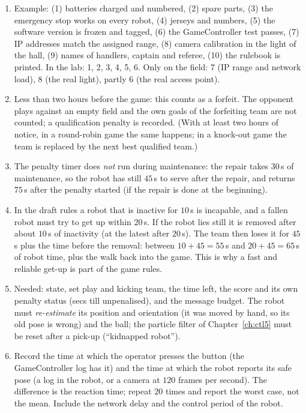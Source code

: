 \begin{enumerate}[label=\textbf{\ansnum.\arabic*}]
  \item Example: (1) batteries charged and numbered, (2) spare parts, (3) the emergency stop works on every robot, (4) jerseys and numbers, (5) the software version is frozen and tagged, (6) the GameController test passes, (7) IP addresses match the assigned range, (8) camera calibration in the light of the hall, (9) names of handlers, captain and referee, (10) the rulebook is printed. In the lab: 1, 2, 3, 4, 5, 6. Only on the field: 7 (IP range and network load), 8 (the real light), partly 6 (the real access point).
  \item Less than two hours before the game: this counts as a forfeit. The opponent plays against an empty field and the own goals of the forfeiting team are not counted; a qualification penalty is recorded. (With at least two hours of notice, in a round-robin game the same happens; in a knock-out game the team is replaced by the next best qualified team.)
  \item The penalty timer does \emph{not} run during maintenance: the repair takes $30$\,s of maintenance, so the robot has still $45$\,s to serve after the repair, and returns $75$\,s after the penalty started (if the repair is done at the beginning).
  \item In the draft rules a robot that is inactive for $10$\,s is incapable, and a fallen robot must try to get up within $20$\,s. If the robot lies still it is removed after about $10$\,s of inactivity (at the latest after $20$\,s). The team then loses it for $45$\,s plus the time before the removal: between $10+45=55$\,s and $20+45=65$\,s of robot time, plus the walk back into the game. This is why a fast and reliable get-up is part of the game rules.
  \item Needed: state, set play and kicking team, the time left, the score and its own penalty status (secs till unpenalised), and the message budget. The robot must \emph{re-estimate} its position and orientation (it was moved by hand, so its old pose is wrong) and the ball; the particle filter of Chapter~\ref{ch:ctl5} must be reset after a pick-up (``kidnapped robot'').
  \item Record the time at which the operator presses the button (the GameController log has it) and the time at which the robot reports its safe pose (a log in the robot, or a camera at $120$ frames per second). The difference is the reaction time; repeat $20$ times and report the worst case, not the mean. Include the network delay and the control period of the robot.

\end{enumerate}
